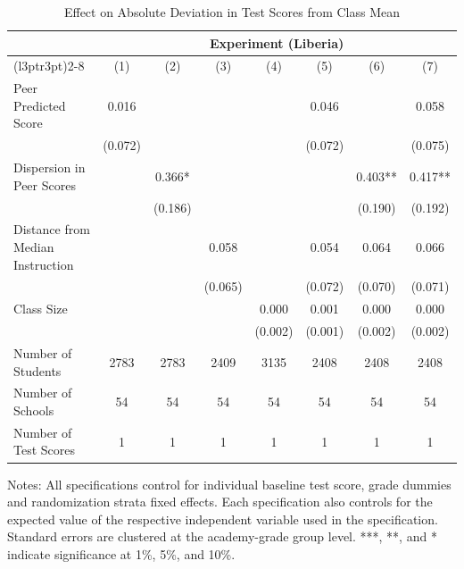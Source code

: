 \begin{table}[!h]
\centering\centering\centering
\caption{Effect on Absolute Deviation in Test Scores from Class Mean}
\centering
\begin{threeparttable}
\fontsize{10}{12}\selectfont
\begin{tabular}[t]{lccccccc}
\toprule
\multicolumn{1}{c}{ } & \multicolumn{7}{c}{Experiment (Liberia)} \\
\cmidrule(l{3pt}r{3pt}){2-8}
  & (1) & (2) & (3) & (4) & (5) & (6) & (7)\\
\midrule
Peer Predicted Score & 0.016 &  &  &  & 0.046 &  & 0.058\\
 & (0.072) &  &  &  & (0.072) &  & (0.075)\\
Dispersion in Peer Scores &  & 0.366* &  &  &  & 0.403** & 0.417**\\
 &  & (0.186) &  &  &  & (0.190) & (0.192)\\
Distance from Median Instruction &  &  & 0.058 &  & 0.054 & 0.064 & 0.066\\
 &  &  & (0.065) &  & (0.072) & (0.070) & (0.071)\\
Class Size &  &  &  & 0.000 & 0.001 & 0.000 & 0.000\\
 &  &  &  & (0.002) & (0.001) & (0.002) & (0.002)\\
\hline
\midrule
Number of Students & 2783 & 2783 & 2409 & 3135 & 2408 & 2408 & 2408\\
Number of Schools & 54 & 54 & 54 & 54 & 54 & 54 & 54\\
Number of Test Scores & 1 & 1 & 1 & 1 & 1 & 1 & 1\\
\bottomrule
\end{tabular}
\begin{tablenotes}[para]
\item Notes: All specifications control for individual baseline test score,
                      grade dummies and randomization strata fixed effects. Each specification
                      also controls for the expected value of the respective independent variable
                      used in the specification. Standard errors are clustered at the academy-grade                              group level. ***, **, and * indicate significance at 1\%, 5\%,  and 10\%.
\end{tablenotes}
\end{threeparttable}
\end{table}
